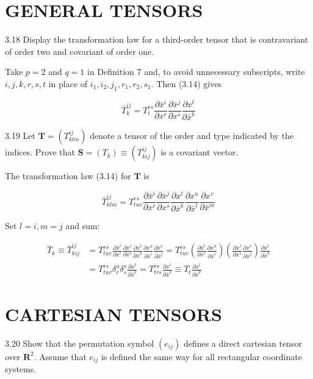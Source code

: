 \documentclass[10pt]{article}
\begin{document}
\section*{GENERAL TENSORS}
3.18 Display the transformation law for a third-order tensor that is contravariant of order two and covariant of order one.

Take $p=2$ and $q=1$ in Definition 7 and, to avoid unnecessary subscripts, write $i, j, k, r, s, t$ in place of $i_{1}, i_{2}, j_{1}, r_{1}, r_{2}, s_{1}$. Then (3.14) gives

$$
\bar{T}_{k}^{i j}=T_{t}^{r s} \frac{\partial \bar{x}^{i}}{\partial x^{r}} \frac{\partial \bar{x}^{j}}{\partial x^{s}} \frac{\partial x^{t}}{\partial \bar{x}^{k}}
$$

3.19 Let $\mathbf{T}=\left(T_{k l m}^{i j}\right)$ denote a tensor of the order and type indicated by the indices. Prove that $\mathbf{S}=\left(T_{k}\right) \equiv\left(T_{k i j}^{i j}\right)$ is a covariant vector.

The transformation law (3.14) for $\mathbf{T}$ is

$$
\bar{T}_{k l m}^{i j}=T_{t u v}^{r s} \frac{\partial \bar{x}^{i}}{\partial x^{r}} \frac{\partial \bar{x}^{j}}{\partial x^{s}} \frac{\partial x^{t}}{\partial \bar{x}^{k}} \frac{\partial x^{u}}{\partial \bar{x}^{l}} \frac{\partial x^{v}}{\partial \bar{x}^{m}}
$$

Set $l=i, m=j$ and sum:

$$
\begin{aligned}
\bar{T}_{k} \equiv \bar{T}_{k i j}^{i j} & =T_{t u v}^{r s} \frac{\partial \bar{x}^{i}}{\partial x^{r}} \frac{\partial \bar{x}^{j}}{\partial x^{s}} \frac{\partial x^{t}}{\partial \bar{x}^{k}} \frac{\partial x^{u}}{\partial \bar{x}^{i}} \frac{\partial x^{v}}{\partial \bar{x}^{j}}=T_{t u v}^{r s}\left(\frac{\partial \bar{x}^{i}}{\partial x^{r}} \frac{\partial x^{u}}{\partial \bar{x}^{i}}\right)\left(\frac{\partial \bar{x}^{j}}{\partial x^{s}} \frac{\partial x^{v}}{\partial \bar{x}^{j}}\right) \frac{\partial x^{t}}{\partial \bar{x}^{k}} \\
& =T_{t u v}^{r s} \delta_{r}^{u} \delta_{s}^{v} \frac{\partial x^{t}}{\partial \bar{x}^{k}}=T_{t r s}^{r s} \frac{\partial x^{t}}{\partial \bar{x}^{k}} \equiv T_{t} \frac{\partial x^{t}}{\partial \bar{x}^{k}}
\end{aligned}
$$

\section*{CARTESIAN TENSORS}
3.20 Show that the permutation symbol $\left(e_{i j}\right)$ defines a direct cartesian tensor over $\mathbf{R}^{2}$. Assume that $e_{i j}$ is defined the same way for all rectangular coordinate systems.
\end{document}
